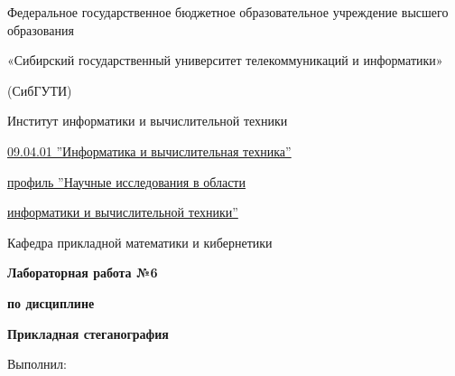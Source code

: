 \documentclass[12pt, a4paper, english, russian]{article}
\begin{document}
\begin{titlepage}
	\begin{center}
		{\fontsize{11}{13}
			Федеральное государственное бюджетное образовательное учреждение высшего образования

			«Сибирский государственный университет телекоммуникаций и информатики»

			(СибГУТИ)
		}
	\end{center}
	\begin{center}
		\begin{large}
			Институт информатики и вычислительной техники
		\end{large}
	\end{center}

	\begin{flushright}
		\begin{minipage}[t]{0.59\textwidth}

			\uline{09.04.01 ''Информатика и вычислительная техника''}

			\uline{профиль ''Научные исследования в области}

			\uline{информатики и вычислительной техники''}

		\end{minipage}
	\end{flushright}

	\vspace{0.012\textheight}

	\begin{center}
		\begin{large}
			Кафедра прикладной математики и кибернетики
		\end{large}
	\end{center}

	\vspace{0.1\textheight}

	\begin{center}
		\begin{Large}
			\textbf{Лабораторная работа №6}

			\textbf{по дисциплине}

			\textbf{Прикладная стеганография}

		\end{Large}
	\end{center}

	\vspace{0.12\textheight}

	\begin{flushleft}
		\begin{large}
			Выполнил:
			\vspace{0.012\textheight}


\end{large}
\end{flushleft}
\end{titlepage}
\end{document}
